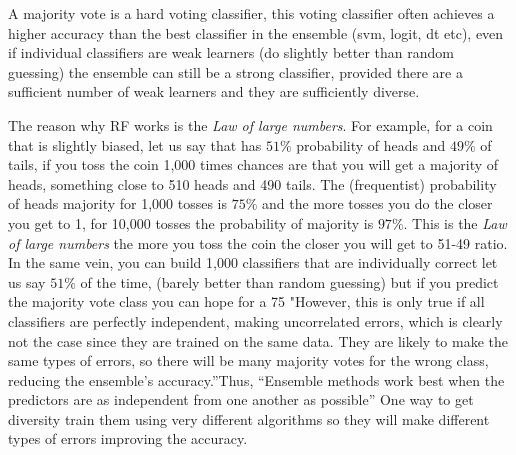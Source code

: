\documentclass[11pt]{article}
\begin{document}
A majority vote is a hard voting classifier, this voting classifier often achieves a higher accuracy than the best classifier in the ensemble (svm, logit, dt etc), even if individual classifiers are weak learners (do slightly better than random guessing) the ensemble can still be a strong classifier, provided there are a sufficient number of weak learners and they are sufficiently diverse. %

The reason why RF works is the \emph{Law of large numbers}. For example, for a coin that is slightly biased, let us say that has $51\%$ probability of heads and $49\%$ of tails, if you toss the coin 1,000 times chances are that you will get a majority  of heads, something close to 510 heads and 490 tails. The (frequentist) probability of heads majority for 1,000 tosses is $75\%$ and the more tosses you do the closer you get to 1, for 10,000 tosses the probability of majority is $97\%$. This is the \emph{Law of large numbers} the more you toss the coin the closer you will get to 51-49 ratio. In the same vein, you can build 1,000 classifiers that are individually correct let us say $51\%$ of the time, (barely better than random guessing) but if you predict the majority vote class you can hope for a 75%
"However, this is only true if all classifiers are perfectly independent, making uncorrelated errors, which is clearly not the case since they are trained on the same data. They are likely to make the same types of errors, so there will be many majority votes for the wrong class, reducing the ensemble’s accuracy.”Thus, “Ensemble methods work best when the predictors are as independent from one another as possible” One way to get diversity train them using very different algorithms so they will make different types of errors improving the accuracy.

\end{document}
